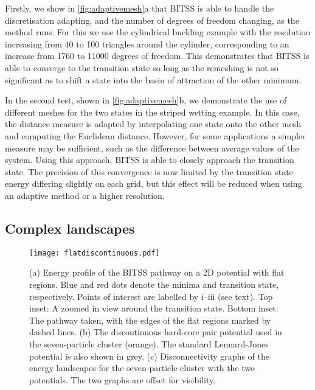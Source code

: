 \documentclass[twocolumn,10pt]{revtex4}
\begin{document}
Firstly, we show in \cref{fig:adaptivemesh}a that BITSS is able to handle the discretisation adapting, and the number of degrees of freedom changing, as the method runs.
For this we use the cylindrical buckling example with the resolution increasing from 40 to 100 triangles around the cylinder, corresponding to an increase from \num{1760} to \num{11000} degrees of freedom.
This demonstrates that BITSS is able to converge to the transition state so long as the remeshing is not so significant as to shift a state into the basin of attraction of the other minimum.

In the second test, shown in \cref{fig:adaptivemesh}b, we demonstrate the use of different meshes for the two states in the striped wetting example.
In this case, the distance measure is adapted by interpolating one state onto the other mesh and computing the Euclidean distance.
However, for some applications a simpler measure may be sufficient, such as the difference between average values of the system.
Using this approach, BITSS is able to closely approach the transition state.
The precision of this convergence is now limited by the transition state energy differing slightly on each grid, but this effect will be reduced when using an adaptive method or a higher resolution.


\subsection{Complex landscapes}
\begin{figure}[tb]
  \texttt{[image: flatdiscontinuous.pdf]}
  \caption{\label{fig:flatdiscontinuous}
    (a) Energy profile of the BITSS pathway on a 2D potential with flat regions.
        Blue and red dots denote the minima and transition state, respectively.
        Points of interest are labelled by i--iii (see text).
        Top inset: A zoomed in view around the transition state.
        Bottom inset: The pathway taken, with the edges of the flat regions marked by dashed lines.
    (b) The discontinuous hard-core pair potential used in the seven-particle cluster (orange).
        The standard Lennard-Jones potential is also shown in grey.
    (c) Disconnectivity graphs of the energy landscapes for the seven-particle cluster with the two potentials.
        The two graphs are offset for visibility.
  }
\end{figure}
\end{document}
